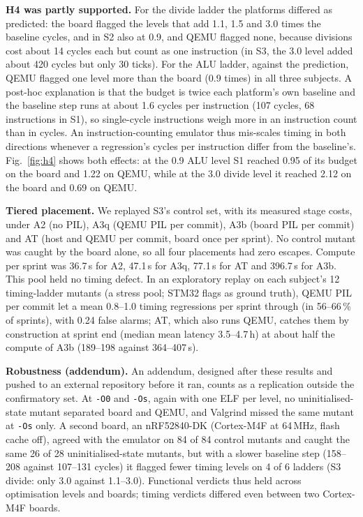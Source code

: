 \documentclass[conference]{IEEEtran}
\begin{document}
\textbf{H4 was partly supported.} For the divide ladder the platforms differed as predicted: the board
flagged the levels that add 1.1, 1.5 and 3.0 times the baseline cycles, and in S2 also at 0.9, and QEMU flagged none, because
divisions cost about 14 cycles each but count as one instruction (in S3, the 3.0 level added about 420 cycles
but only 30 ticks). For the ALU ladder, against the prediction,
QEMU flagged one level more than the board (0.9 times) in all three subjects. A post-hoc explanation is that
the budget is twice each platform's own baseline and the baseline step runs at about 1.6 cycles per
instruction (107 cycles, 68 instructions in S1), so single-cycle instructions weigh more in an instruction
count than in cycles. An instruction-counting emulator thus mis-scales timing in both directions whenever a
regression's cycles per instruction differ from the baseline's. Fig.~\ref{fig:h4} shows both effects: at the 0.9 ALU level S1
reached 0.95 of its budget on the board and 1.22 on QEMU, while at the 3.0 divide level it reached 2.12 on
the board and 0.69 on QEMU.

\textbf{Tiered placement.} We replayed S3's control set, with its measured stage costs, under A2 (no PIL), A3q
(QEMU PIL per commit), A3b (board PIL per commit) and AT (host and QEMU per commit, board once per sprint).
No control mutant was caught by the board alone, so all four placements had zero escapes. Compute per sprint
was 36.7\,s for A2, 47.1\,s for A3q, 77.1\,s for AT and 396.7\,s for A3b. This pool held no timing defect. In an exploratory replay on each subject's 12
timing-ladder mutants (a stress pool; STM32 flags as ground truth), QEMU PIL per commit let a mean
0.8--1.0 timing regressions per sprint through (in 56--66\,\% of sprints), with 0.24 false alarms; AT, which
also runs QEMU, catches them by construction at sprint end (median mean latency 3.5--4.7\,h) at about half
the compute of A3b (189--198 against 364--407\,s).

\textbf{Robustness (addendum).} An addendum, designed after these results and pushed to an external
repository before it ran, counts as a replication outside the confirmatory set. At \texttt{-O0} and
\texttt{-Os}, again with one ELF per level, no uninitialised-state mutant separated board and QEMU, and Valgrind
missed the same mutant at \texttt{-Os} only. A second board, an nRF52840-DK (Cortex-M4F at 64\,MHz, flash cache off), agreed with the
emulator on 84 of 84 control mutants and caught the same 26 of 28 uninitialised-state
mutants, but with a slower baseline step (158--208 against 107--131 cycles) it flagged fewer timing levels on
4 of 6 ladders (S3 divide: only 3.0 against 1.1--3.0). Functional verdicts thus held across optimisation
levels and boards; timing verdicts differed even between two Cortex-M4F boards.
\end{document}
